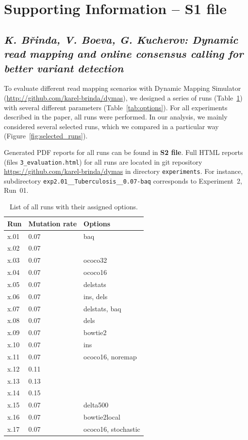 \documentclass[11pt]{article}
\begin{document}
\section*{Supporting Information -- S1 file}
\subsection*{\emph{K. Břinda, V. Boeva, G. Kucherov: Dynamic read mapping and online consensus calling for better variant detection}}


To evaluate different read mapping scenarios with Dynamic Mapping Simulator (\url{http://github.com/karel-brinda/dymas}),
we designed a series of runs (Table~\ref{tab:all_runs}) with several different parameters (Table~\ref{tab:options}). For all experiments described in the paper, all runs were performed. In our analysis, we mainly considered several selected runs, which we compared in a particular way (Figure~\ref{fig:selected_runs}).

Generated PDF reports for all runs can be found in \textbf{S2 file}. Full HTML reports (files \texttt{3\_evaluation.html}) for all runs are located in git repository
\url{https://github.com/karel-brinda/dymas} in directory \texttt{experiments}. For instance, subdirectory \texttt{exp2.01\_\_Tuberculosis\_\_0.07-baq} corresponds to Experiment~2, Run~01.


\clearpage

\begin{table}[h!]
\begin{center}
\begin{tabular}{lll}
        \textbf{Run} & \textbf{Mutation rate} & \textbf{Options}\\\hline
        x.01 & 0.07 & baq \\
        x.02 & 0.07 & \\
        x.03 & 0.07 & ococo32 \\
        x.04 & 0.07 & ococo16 \\
        x.05 & 0.07 & delstats \\
        x.06 & 0.07 & ins, dels \\
        x.07 & 0.07 & delstats, baq \\
        x.08 & 0.07 & dels \\
        x.09 & 0.07 & bowtie2 \\
        x.10 & 0.07 & ins \\
        x.11 & 0.07 & ococo16, noremap \\
        x.12 & 0.11 & \\
        x.13 & 0.13 & \\
        x.14 & 0.15 & \\
        x.15 & 0.07 & delta500 \\
        x.16 & 0.07 & bowtie2local \\
        x.17 & 0.07 & ococo16, stochastic
\end{tabular}
\end{center}
\caption{List of all runs with their assigned options.}
\label{tab:all_runs}
\end{table}
\end{document}

